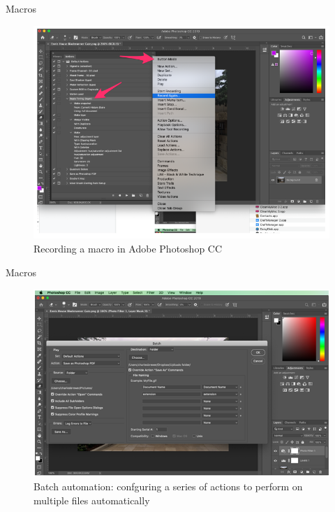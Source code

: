 \documentclass{beamer}
\begin{document}
\begin{frame}[t]{Macros}
	\begin{figure}[h]
		\centering
		\includegraphics[scale=0.6]{images/lec08-pic27.png}
		\caption{Recording a macro in Adobe Photoshop CC}
	\end{figure}
\end{frame}

\begin{frame}[t]{Macros}
	\begin{figure}[h]
		\centering
		\includegraphics[scale=0.6]{images/lec08-pic28.png}
		\caption{Batch automation: confguring a series of actions to perform on multiple files automatically}
	\end{figure}
\end{frame}
\end{document}
